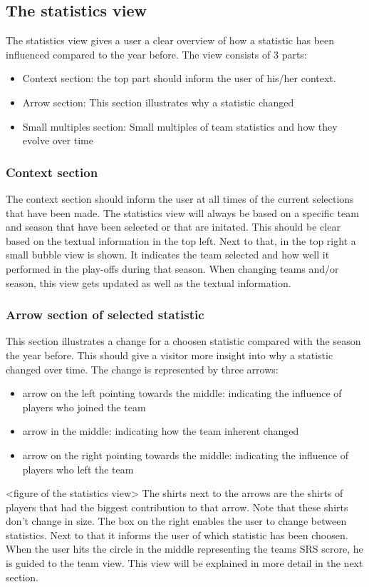 \documentclass{sigchi}
\begin{document}
\subsection{The statistics view}
The statistics view gives a user a clear overview of how a statistic has been 
influenced compared to the year before. The view consists of 3 parts:
\begin{itemize}
    \item Context section: the top part should inform the user of his/her
        context.
    \item Arrow section: This section illustrates why a statistic changed
    \item Small multiples section: Small multiples of team statistics and how
        they evolve over time
\end{itemize}
\subsubsection{Context section}
The context section should inform the user at all times of the current selections 
that have been made. The statistics view will always be based on a specific team
and season that have been selected or that are initated. This should be clear based
on the textual information in the top left. Next to that, in the top right a small 
bubble view is shown. It indicates the team selected and how well it performed in 
the play-offs during that season. When changing teams and/or season, this view gets 
updated as well as the textual information.

\subsubsection{Arrow section of selected statistic}
This section illustrates a change for a choosen statistic compared with the season
the year before. This should give a visitor more insight into why a statistic changed
over time. The change is represented by three arrows:
\begin{itemize}
    \item arrow on the left pointing towards the middle: indicating the influence of players
    who joined the team
    \item arrow in the middle: indicating how the team inherent changed
    \item arrow on the right pointing towards the middle: indicating the influence of players
who left the team
\end{itemize}
<figure of the statistics view>
The shirts next to the arrows are the shirts of players that had the biggest 
contribution to that arrow. Note that these shirts don't change in size. The box on 
the right enables the user to change between 
statistics. Next to that it informs the user of which statistic has been choosen. When 
the user hits the circle in the middle representing the teams SRS scrore, he is guided 
to the team view. This view will be explained in more detail in the next section.
\end{document}

